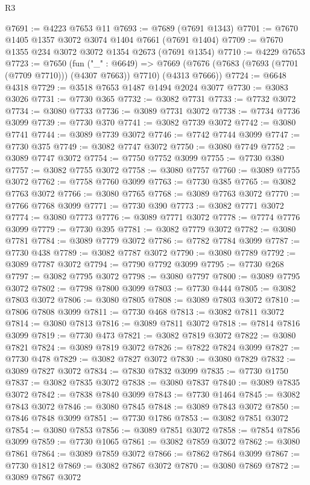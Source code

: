 \begin{lexlean}{R3}
\begin{coremodule}
@7691 := @4223 @7653 @11
@7693 := @7689 (@7691 @1343)
@7701 := @7670 @1405 @1357 @3072 @3074 @1404 @7661 (@7691 @1404)
@7709 := @7670 @1355 @234 @3072 @3072 @1354 @2673 (@7691 @1354)
@7710 := @4229 @7653
@7723 := @7650
    (fun ("_" : @6649) =>
    @7669 (@7676 (@7683 (@7693 (@7701 (@7709 @7710))) (@4307 @7663)) @7710) (@4313 @7666))
@7724 := @6648 @4318
@7729 := @3518 @7653 @1487 @1494 @2024 @3077
@7730 := @3083 @3026
@7731 := @7730 @365
@7732 := @3082 @7731
@7733 := @7732 @3072
@7734 := @3080 @7733
@7736 := @3089 @7731 @3072
@7738 := @7734 @7736 @3099
@7739 := @7730 @370
@7741 := @3082 @7739 @3072
@7742 := @3080 @7741
@7744 := @3089 @7739 @3072
@7746 := @7742 @7744 @3099
@7747 := @7730 @375
@7749 := @3082 @7747 @3072
@7750 := @3080 @7749
@7752 := @3089 @7747 @3072
@7754 := @7750 @7752 @3099
@7755 := @7730 @380
@7757 := @3082 @7755 @3072
@7758 := @3080 @7757
@7760 := @3089 @7755 @3072
@7762 := @7758 @7760 @3099
@7763 := @7730 @385
@7765 := @3082 @7763 @3072
@7766 := @3080 @7765
@7768 := @3089 @7763 @3072
@7770 := @7766 @7768 @3099
@7771 := @7730 @390
@7773 := @3082 @7771 @3072
@7774 := @3080 @7773
@7776 := @3089 @7771 @3072
@7778 := @7774 @7776 @3099
@7779 := @7730 @395
@7781 := @3082 @7779 @3072
@7782 := @3080 @7781
@7784 := @3089 @7779 @3072
@7786 := @7782 @7784 @3099
@7787 := @7730 @438
@7789 := @3082 @7787 @3072
@7790 := @3080 @7789
@7792 := @3089 @7787 @3072
@7794 := @7790 @7792 @3099
@7795 := @7730 @268
@7797 := @3082 @7795 @3072
@7798 := @3080 @7797
@7800 := @3089 @7795 @3072
@7802 := @7798 @7800 @3099
@7803 := @7730 @444
@7805 := @3082 @7803 @3072
@7806 := @3080 @7805
@7808 := @3089 @7803 @3072
@7810 := @7806 @7808 @3099
@7811 := @7730 @468
@7813 := @3082 @7811 @3072
@7814 := @3080 @7813
@7816 := @3089 @7811 @3072
@7818 := @7814 @7816 @3099
@7819 := @7730 @473
@7821 := @3082 @7819 @3072
@7822 := @3080 @7821
@7824 := @3089 @7819 @3072
@7826 := @7822 @7824 @3099
@7827 := @7730 @478
@7829 := @3082 @7827 @3072
@7830 := @3080 @7829
@7832 := @3089 @7827 @3072
@7834 := @7830 @7832 @3099
@7835 := @7730 @1750
@7837 := @3082 @7835 @3072
@7838 := @3080 @7837
@7840 := @3089 @7835 @3072
@7842 := @7838 @7840 @3099
@7843 := @7730 @1464
@7845 := @3082 @7843 @3072
@7846 := @3080 @7845
@7848 := @3089 @7843 @3072
@7850 := @7846 @7848 @3099
@7851 := @7730 @1786
@7853 := @3082 @7851 @3072
@7854 := @3080 @7853
@7856 := @3089 @7851 @3072
@7858 := @7854 @7856 @3099
@7859 := @7730 @1065
@7861 := @3082 @7859 @3072
@7862 := @3080 @7861
@7864 := @3089 @7859 @3072
@7866 := @7862 @7864 @3099
@7867 := @7730 @1812
@7869 := @3082 @7867 @3072
@7870 := @3080 @7869
@7872 := @3089 @7867 @3072

\end{coremodule}
\end{lexlean}
